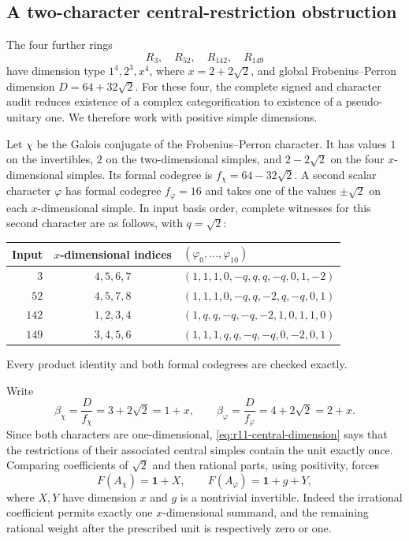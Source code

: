 \subsection{A two-character central-restriction obstruction}
\label{subsec:r11-two-character}

The four further rings
\[
 R_3,\quad R_{52},\quad R_{142},\quad R_{149}
\]
have dimension type $1^4,2^3,x^4$, where
$x=2+2\sqrt2$, and global Frobenius--Perron dimension
$D=64+32\sqrt2$. For these four, the complete signed and character audit
reduces existence of a complex categorification to existence of a
pseudo-unitary one. We therefore work with positive simple dimensions.

Let $\chi$ be the Galois conjugate of the Frobenius--Perron character.
It has values $1$ on the invertibles, $2$ on the two-dimensional simples,
and $2-2\sqrt2$ on the four $x$-dimensional simples. Its formal codegree is
$f_\chi=64-32\sqrt2$. A second scalar character $\varphi$ has formal
codegree $f_\varphi=16$ and takes one of the values $\pm\sqrt2$ on each
$x$-dimensional simple. In input basis order, complete witnesses for this
second character are as follows, with $q=\sqrt2$:
\begin{center}
\small
\renewcommand{\arraystretch}{1.2}
\begin{tabular}{@{}rcl@{}}
\toprule
Input & $x$-dimensional indices & $(\varphi_0,\ldots,\varphi_{10})$\\
\midrule
$3$   & $4,5,6,7$ & $(1,1,1,0,-q,q,q,-q,0,1,-2)$\\
$52$  & $4,5,7,8$ & $(1,1,1,0,-q,q,-2,q,-q,0,1)$\\
$142$ & $1,2,3,4$ & $(1,q,q,-q,-q,-2,1,0,1,1,0)$\\
$149$ & $3,4,5,6$ & $(1,1,1,q,q,-q,-q,0,-2,0,1)$\\
\bottomrule
\end{tabular}
\end{center}
Every product identity and both formal codegrees are checked exactly.

Write
\[
 \beta_\chi=\frac{D}{f_\chi}=3+2\sqrt2=1+x,
 \qquad
 \beta_\varphi=\frac{D}{f_\varphi}=4+2\sqrt2=2+x.
\]
Since both characters are one-dimensional,
\eqref{eq:r11-central-dimension} says that the restrictions of their
associated central simples contain the unit exactly once. Comparing
coefficients of $\sqrt2$ and then rational parts, using positivity, forces
\begin{equation}\label{eq:r11-forced-restrictions}
 F(A_\chi)=\mathbf1+X,
 \qquad
 F(A_\varphi)=\mathbf1+g+Y,
\end{equation}
where $X,Y$ have dimension $x$ and $g$ is a nontrivial invertible.
Indeed the irrational coefficient permits exactly one $x$-dimensional
summand, and the remaining rational weight after the prescribed unit is
respectively zero or one.

